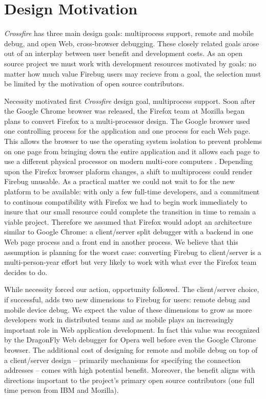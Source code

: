 \section{Design Motivation}
\textit{Crossfire} has three main design goals: multiprocess support, remote and 
mobile debug, and open Web, cross-browser debugging.
These closely related goals arose out of an interplay between user benefit and development costs.
As an open source project we must work with development resources motivated by
goals: no matter how much value Firebug users may recieve from a goal, the
selection must be limited by the motivation of open source contributors.

Necessity motivated first \textit{Crossfire} design goal, multiprocess support.
Soon after the Google Chrome browser was released, the Firefox team at Mozilla
began plans to convert Firefox to a multi-processor design.  The Google browser
used one controlling process for the application and one process for each Web
page.  This allows the browser to use the operating system isolation to prevent
problems on one page from bringing down the entire application and it allows
each page to use a different physical processor on modern multi-core computers
\cite{GoogleChrome}.  Depending upon the Firefox browser plaform changes, a
shift to multiprocess could render Firebug unusable. As a practical matter we
could not wait to for the new platform to be available: with only a few full-time 
developers, and a commitment to continous
compatibility with Firefox we had to begin work immediately to insure that our
small resource could complete the transition in time to remain a viable project.
Therefore we assumed that Firefox would adopt an architecture similar to Google
Chrome: a client/server split debugger with a backend in one Web page process
and a front end in another process.  We believe that this assumption is planning
for the worst case: converting Firebug to client/server is a multi-person-year
effort but very likely to work with what ever the Firefox team decides to do.

While necessity forced our action, opportunity followed. The client/server
choice, if successful, adds two new dimensions to Firebug for users: remote
debug and mobile device debug. We expect the value of these dimensions to grow
as more developers work in distributed teams and as mobile plays an increasingly
important role in Web application development.  In fact this value was
recognized by the DragonFly Web debugger for Opera well before even the Google
Chrome browser.   The additional cost of designing for remote and mobile debug
on top of a client/server design -- primarily mechanisms for specifying the
connection addresses -- comes with high potential benefit.  Moreover, the benefit
aligns with directions important to the project's primary open source
contributors (one full time person from IBM and Mozilla).

